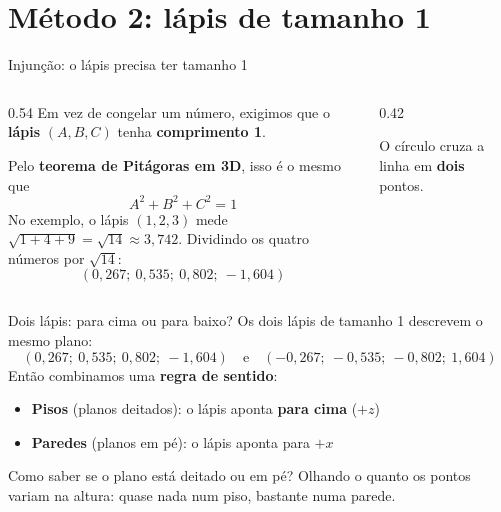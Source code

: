 \documentclass[aspectratio=169,11pt]{beamer}
\newcommand{\bnum}[1]{\textbf{\textcolor{mTeal}{#1}}}
\begin{document}
\section{Método 2: lápis de tamanho 1}

\begin{frame}{Injunção: o lápis precisa ter tamanho 1}
  \begin{columns}[c]
    \begin{column}{0.54\textwidth}
      Em vez de congelar um número, exigimos que o \textcolor{corInjuncao}{\textbf{lápis}}
      $(A, B, C)$ tenha \textcolor{corInjuncao}{\textbf{comprimento 1}}.
      \bigskip

      Pelo \bnum{teorema de Pitágoras em 3D}, isso é o mesmo que
      \[ A^2 + B^2 + C^2 = 1 \]
      No exemplo, o lápis $(1, 2, 3)$ mede $\sqrt{1 + 4 + 9} = \sqrt{14} \approx 3{,}742$.
      Dividindo os quatro números por $\sqrt{14}$:
      \[ (0{,}267;\ 0{,}535;\ 0{,}802;\ -1{,}604) \]
    \end{column}
    \begin{column}{0.42\textwidth}
      \centering
      \smallskip

      {\scriptsize\textcolor{mStoneMid}{O círculo cruza a linha em \textbf{dois} pontos.}}
    \end{column}
  \end{columns}
\end{frame}

\begin{frame}{Dois lápis: para cima ou para baixo?}
  Os dois lápis de tamanho 1 descrevem o mesmo plano:
  \[ (0{,}267;\ 0{,}535;\ 0{,}802;\ -1{,}604) \quad\text{e}\quad
     (-0{,}267;\ -0{,}535;\ -0{,}802;\ 1{,}604) \]
  Então combinamos uma \bnum{regra de sentido}:
  \bigskip
  \begin{itemize}
    \item \textbf{Pisos} (planos deitados): o lápis aponta \bnum{para cima} ($+z$)
    \item \textbf{Paredes} (planos em pé): o lápis aponta para \bnum{$+x$}
  \end{itemize}
  \bigskip
  {\small\textcolor{mStoneMid}{Como saber se o plano está deitado ou em pé? Olhando o quanto os
  pontos variam na altura: quase nada num piso, bastante numa parede.}}
\end{frame}
\end{document}

